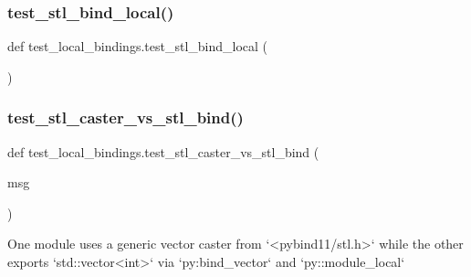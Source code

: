 \subsubsection{\texorpdfstring{test\_stl\_bind\_local()}{test\_stl\_bind\_local()}}
{\footnotesize\ttfamily def test\+\_\+local\+\_\+bindings.\+test\+\_\+stl\+\_\+bind\+\_\+local (\begin{DoxyParamCaption}{ }\end{DoxyParamCaption})}

\mbox{\label{namespacetest__local__bindings_ad5623f08ba98a36b99196b9461a0d1ca}} 
\subsubsection{\texorpdfstring{test\_stl\_caster\_vs\_stl\_bind()}{test\_stl\_caster\_vs\_stl\_bind()}}
{\footnotesize\ttfamily def test\+\_\+local\+\_\+bindings.\+test\+\_\+stl\+\_\+caster\+\_\+vs\+\_\+stl\+\_\+bind (\begin{DoxyParamCaption}\item[{}]{msg }\end{DoxyParamCaption})}

\begin{DoxyVerb}One module uses a generic vector caster from `<pybind11/stl.h>` while the other
exports `std::vector<int>` via `py:bind_vector` and `py::module_local`\end{DoxyVerb}
 